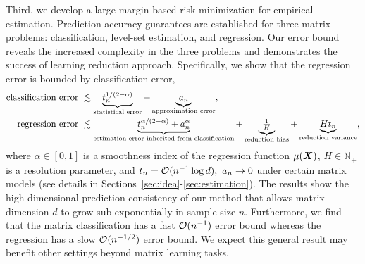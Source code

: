 \documentclass[11pt]{article}
\newcommand*{\KeepStyleUnderBrace}[1]{%
\mathop{%
\mathchoice
{\underbrace{\displaystyle#1}}%
{\underbrace{\textstyle#1}}%
{\underbrace{\scriptstyle#1}}%
{\underbrace{\scriptscriptstyle#1}}%
}\limits
}
\newtheorem*{theorem*}{Theorem}
\theoremstyle{plain}
\theoremstyle{definition}
\begin{document}
Third, we develop a large-margin based risk minimization for empirical estimation. Prediction accuracy guarantees are established for three matrix problems: classification, level-set estimation, and regression. Our error bound reveals the increased complexity in the three problems and demonstrates the success of learning reduction approach. Specifically, we show that the regression error is bounded by classification error,
\begin{align}
\text{classification error }& \lesssim \KeepStyleUnderBrace{t_n^{1/( 2-\alpha)}}_{\text{statistical error}}+\KeepStyleUnderBrace{a_n}_{\text{approximation error}},\\
\text{regression error } & \lesssim  \KeepStyleUnderBrace{t_n^{\alpha/(2-\alpha)}+a^\alpha_n}_{\text{estimation error inherited from classification}}+\KeepStyleUnderBrace{\textstyle{1\over H}}_{\text{reduction bias}}+\KeepStyleUnderBrace{Ht_n}_{\text{reduction variance}},
\end{align}
where $\alpha\in[0,1]$ is a smoothness index of the regression function $\mu(\bm X)$, $H\in\mathbb{N}_{+}$ is a resolution parameter, and $t_n=\mathcal{O}(n^{-1}\log d ),\ a_n\to 0$ under certain matrix models (see details in Sections~\ref{sec:idea}-\ref{sec:estimation}). 
The results show the high-dimensional prediction consistency of our method that allows matrix dimension $d$ to grow sub-exponentially in sample size $n$. Furthermore, we find that the matrix classification has a fast $\mathcal{O}(n^{-1})$ error bound whereas the regression has a slow $\mathcal{O}(n^{-1/2})$ error bound. We expect this general result may benefit other settings beyond matrix learning tasks.  
\end{document}
